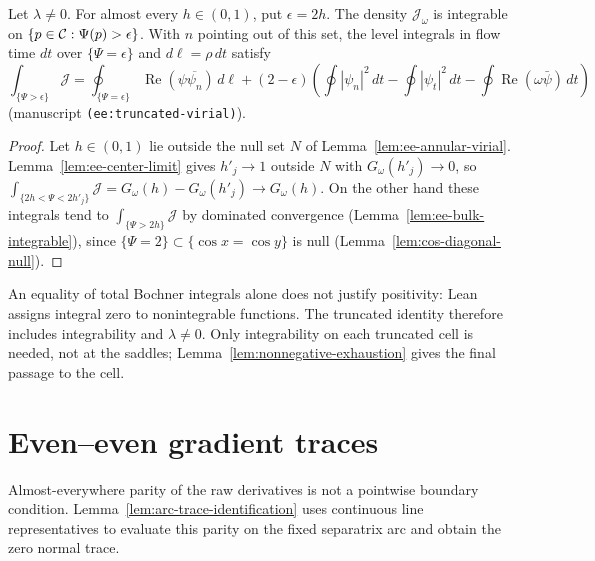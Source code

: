 \begin{lemma}
\label{lem:ee-truncated-virial}
\leanok
Let $\lambda\ne0$. For almost every $h\in(0,1)$, put $\epsilon=2h$. The density $\mathcal J_\omega$ is
integrable on $\{p\in\mathcal{C}:\Psi(p)>\epsilon\}$. With $n$ pointing out of this set, the level
integrals in flow time $dt$ over $\{\Psi=\epsilon\}$ and $d\ell=\rho\,dt$ satisfy
\[
  \int_{\{\Psi>\epsilon\}}\mathcal J
  =\oint_{\{\Psi=\epsilon\}}\operatorname{Re}(\psi\overline{\psi_n})\,d\ell
   +(2-\epsilon)\left(\oint|\psi_n|^2\,dt-\oint|\psi_t|^2\,dt
     -\oint\operatorname{Re}(\omega\bar\psi)\,dt\right)
\]
(manuscript \texttt{(ee:truncated-virial)}).
\end{lemma}

\begin{proof}
\leanok
Let $h\in(0,1)$ lie outside the null set $N$ of Lemma~\ref{lem:ee-annular-virial}.
Lemma~\ref{lem:ee-center-limit} gives $h'_j\to1$ outside $N$ with $G_\omega(h'_j)\to0$, so
$\int_{\{2h<\Psi<2h'_j\}}\mathcal J=G_\omega(h)-G_\omega(h'_j)\to G_\omega(h)$. On the other hand
these integrals tend to $\int_{\{\Psi>2h\}}\mathcal J$ by dominated convergence
(Lemma~\ref{lem:ee-bulk-integrable}), since $\{\Psi=2\}\subset\{\cos x=\cos y\}$ is null
(Lemma~\ref{lem:cos-diagonal-null}).
\end{proof}

\begin{remark}
An equality of total Bochner integrals alone does not justify positivity:
Lean assigns integral zero to nonintegrable functions. The truncated
identity therefore includes integrability and $\lambda\ne0$. Only
integrability on each truncated cell is needed, not at the saddles;
Lemma~\ref{lem:nonnegative-exhaustion} gives the final passage to the cell.
\end{remark}

\section{Even--even gradient traces}
\label{sec:ee-gradient-limits}

\begin{remark}
Almost-everywhere parity of the raw derivatives is not a pointwise
boundary condition. Lemma~\ref{lem:arc-trace-identification} uses
continuous line representatives to evaluate this parity on the fixed
separatrix arc and obtain the zero normal trace.
\end{remark}

